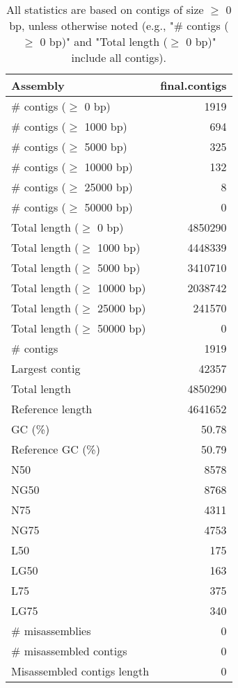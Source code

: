 \documentclass[12pt,a4paper]{article}
\begin{document}
\begin{table}[ht]
\begin{center}
\caption{All statistics are based on contigs of size $\geq$ 0 bp, unless otherwise noted (e.g., "\# contigs ($\geq$ 0 bp)" and "Total length ($\geq$ 0 bp)" include all contigs).}
\begin{tabular}{|l*{1}{|r}|}
\hline
Assembly & final.contigs \\ \hline
\# contigs ($\geq$ 0 bp) & 1919 \\ \hline
\# contigs ($\geq$ 1000 bp) & 694 \\ \hline
\# contigs ($\geq$ 5000 bp) & 325 \\ \hline
\# contigs ($\geq$ 10000 bp) & 132 \\ \hline
\# contigs ($\geq$ 25000 bp) & 8 \\ \hline
\# contigs ($\geq$ 50000 bp) & 0 \\ \hline
Total length ($\geq$ 0 bp) & 4850290 \\ \hline
Total length ($\geq$ 1000 bp) & 4448339 \\ \hline
Total length ($\geq$ 5000 bp) & 3410710 \\ \hline
Total length ($\geq$ 10000 bp) & 2038742 \\ \hline
Total length ($\geq$ 25000 bp) & 241570 \\ \hline
Total length ($\geq$ 50000 bp) & 0 \\ \hline
\# contigs & 1919 \\ \hline
Largest contig & 42357 \\ \hline
Total length & 4850290 \\ \hline
Reference length & 4641652 \\ \hline
GC (\%) & 50.78 \\ \hline
Reference GC (\%) & 50.79 \\ \hline
N50 & 8578 \\ \hline
NG50 & 8768 \\ \hline
N75 & 4311 \\ \hline
NG75 & 4753 \\ \hline
L50 & 175 \\ \hline
LG50 & 163 \\ \hline
L75 & 375 \\ \hline
LG75 & 340 \\ \hline
\# misassemblies & 0 \\ \hline
\# misassembled contigs & 0 \\ \hline
Misassembled contigs length & 0 \\ \hline

\end{tabular}
\end{center}
\end{table}
\end{document}
